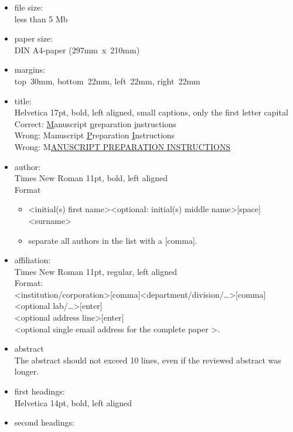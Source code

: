 \documentclass{ISMA_USD2020}
\begin{document}
\begin{itemize}
  \item file size:\\
    less than 5 Mb
  \item paper size:\\
    DIN A4-paper \mbox{(297mm x 210mm)}
  \item margins:\\
    top~30mm, bottom~22mm, left~22mm, right~22mm
  \item title:\\
    Helvetica 17pt, bold, left aligned, small captions, only the first letter capital \\
    Correct: \underline{M}anuscript \underline{p}reparation \underline{i}nstructions\\
    Wrong: Manuscript \underline{P}reparation \underline{I}nstructions\\
    Wrong: M\underline{ANUSCRIPT PREPARATION INSTRUCTIONS}
  \item author:\\
    Times New Roman 11pt, bold, left aligned\\
    Format
    \begin{itemize}
    	\item \textless initial(s) first name\textgreater\textless optional: initial(s) middle name\textgreater[space]\textless surname\textgreater
    	\item separate all authors in the list with a [comma].
    \end{itemize}
  \item affiliation:\\
    Times New Roman 11pt, regular, left aligned\\
    Format:\\
    \textless institution/corporation\textgreater[comma]\textless department/division/…\textgreater[comma]\textless optional lab/…\textgreater [enter]\\
    \textless optional address line\textgreater [enter]\\
    \textless optional single email address for the complete paper \textgreater.
  \item abstract\\
    The abstract should not exceed 10 lines, even if the reviewed abstract was longer.
  \item first headings:\\
    Helvetica 14pt, bold, left aligned
  \item second headings:\\

\end{itemize}
\end{document}
